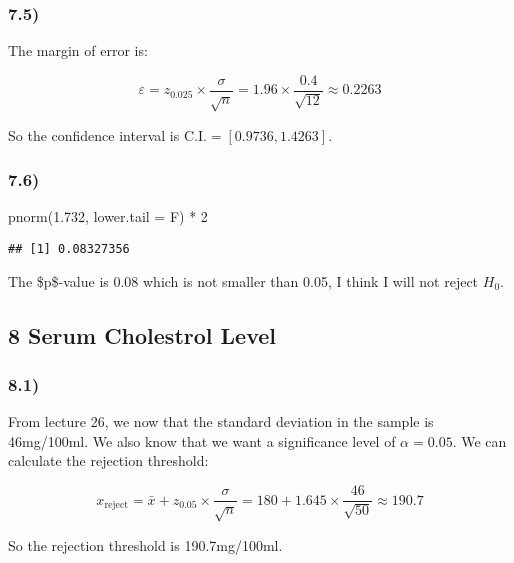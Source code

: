 \documentclass[
]{article}
\newenvironment{Shaded}{\begin{snugshade}}{\end{snugshade}}
\newcommand{\AttributeTok}[1]{\textcolor[rgb]{0.77,0.63,0.00}{#1}}
\newcommand{\DecValTok}[1]{\textcolor[rgb]{0.00,0.00,0.81}{#1}}
\newcommand{\FloatTok}[1]{\textcolor[rgb]{0.00,0.00,0.81}{#1}}
\newcommand{\FunctionTok}[1]{\textcolor[rgb]{0.00,0.00,0.00}{#1}}
\newcommand{\NormalTok}[1]{#1}
\newcommand{\SpecialCharTok}[1]{\textcolor[rgb]{0.00,0.00,0.00}{#1}}
\begin{document}
\hypertarget{section-16}{%
\subsubsection{7.5)}\label{section-16}}

The margin of error is:

\[
\varepsilon = z_{0.025} \times \frac{\sigma}{\sqrt{n}} = 1.96 \times \frac{0.4}{\sqrt{12}} \approx 0.2263
\]

So the confidence interval is \(\text{C.I.} = [0.9736, 1.4263]\).

\hypertarget{section-17}{%
\subsubsection{7.6)}\label{section-17}}

\begin{Shaded}
\begin{Highlighting}[]
\FunctionTok{pnorm}\NormalTok{(}\FloatTok{1.732}\NormalTok{, }\AttributeTok{lower.tail =}\NormalTok{ F) }\SpecialCharTok{*} \DecValTok{2}
\end{Highlighting}
\end{Shaded}

\begin{verbatim}
## [1] 0.08327356
\end{verbatim}

The \$p\$-value is 0.08 which is not smaller than 0.05, I think I will
not reject \(H_0\).

\hypertarget{serum-cholestrol-level}{%
\subsection{8 Serum Cholestrol Level}\label{serum-cholestrol-level}}

\hypertarget{section-18}{%
\subsubsection{8.1)}\label{section-18}}

From lecture 26, we now that the standard deviation in the sample is
46mg/100ml. We also know that we want a significance level of
\(\alpha = 0.05\). We can calculate the rejection threshold:

\[
x_{\text{reject}} = \bar x + z_{0.05} \times \frac{\sigma}{\sqrt{n}} = 180 + 1.645 \times \frac{46}{\sqrt{50}} \approx 190.7
\]

So the rejection threshold is 190.7mg/100ml.
\end{document}
